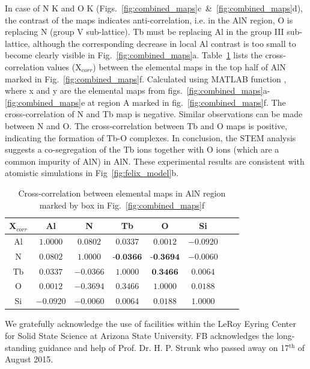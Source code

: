 \documentclass[%
aip,
rsi,%
 amsmath,amssymb,%
 reprint,%
]{revtex4-1}
\begin{document}
In case of N K and O K (Figs.~\ref{fig:combined_maps}c~\&~\ref{fig:combined_maps}d), the contrast of the maps indicates anti-correlation, i.e. in the AlN region, O is replacing N (group V sub-lattice). Tb must be replacing Al in the group III sub-lattice, although the corresponding decrease in local Al contrast is too small to become clearly visible in Fig.~\ref{fig:combined_maps}a. Table~\ref{tab:xcorr} lists the cross-correlation values (X$_{corr}$) between the elemental maps in the top half of AlN marked in Fig.~\ref{fig:combined_maps}f. Calculated using MATLAB function , where x and y are the elemental maps from figs.~\ref{fig:combined_maps}a-\ref{fig:combined_maps}e at region A marked in fig.~\ref{fig:combined_maps}f. The cross-correlation of N and Tb map is negative. Similar observations can be made between N and O. The cross-correlation between Tb and O maps is positive, indicating the formation of Tb-O complexes. In conclusion, the STEM analysis suggests a co-segregation of the Tb ions together with O ions (which are a common impurity of AlN) in AlN. These experimental results are consistent with atomistic simulations in Fig~\ref{fig:felix_model}b.
\begin{table}[h]
	\caption{Cross-correlation between elemental maps in AlN region marked by box in Fig.~\ref{fig:combined_maps}f}
    \label{tab:xcorr}
    \begin{ruledtabular}
    	\begin{tabular}{cccccccc}
        	X$_{corr}$&Al&N&Tb&O&Si													\\ \hline
            Al& $1.0000$& $0.0802$& $0.0337$& $0.0012$&$-0.0920$					\\
             N& $0.0802$& $1.0000$& $\textbf{-0.0366}$&$\textbf{-0.3694}$&$-0.0060$	\\
            Tb& $0.0337$&$-0.0366$& $1.0000$& $\textbf{0.3466}$&$0.0064$			\\
             O& $0.0012$&$-0.3694$&	$0.3466$& $1.0000$&$0.0188$						\\
            Si&$-0.0920$&$-0.0060$&$0.0064$&$0.0188$& $1.0000$
    	\end{tabular}
    \end{ruledtabular}
\end{table}

\begin{acknowledgments}
We gratefully acknowledge the use of facilities within the LeRoy Eyring Center for Solid State Science at Arizona State University. FB acknowledges the long-standing guidance and help of Prof. Dr. H. P. Strunk who passed away on 17$^\text{th}$ of August 2015.
\end{acknowledgments}

\end{document}
